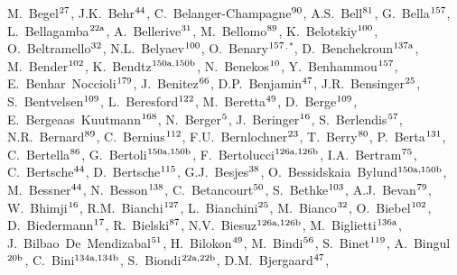 \begin{flushleft}
M.~Begel$^\textrm{\scriptsize 27}$,
J.K.~Behr$^\textrm{\scriptsize 44}$,
C.~Belanger-Champagne$^\textrm{\scriptsize 90}$,
A.S.~Bell$^\textrm{\scriptsize 81}$,
G.~Bella$^\textrm{\scriptsize 157}$,
L.~Bellagamba$^\textrm{\scriptsize 22a}$,
A.~Bellerive$^\textrm{\scriptsize 31}$,
M.~Bellomo$^\textrm{\scriptsize 89}$,
K.~Belotskiy$^\textrm{\scriptsize 100}$,
O.~Beltramello$^\textrm{\scriptsize 32}$,
N.L.~Belyaev$^\textrm{\scriptsize 100}$,
O.~Benary$^\textrm{\scriptsize 157}$$^{,*}$,
D.~Benchekroun$^\textrm{\scriptsize 137a}$,
M.~Bender$^\textrm{\scriptsize 102}$,
K.~Bendtz$^\textrm{\scriptsize 150a,150b}$,
N.~Benekos$^\textrm{\scriptsize 10}$,
Y.~Benhammou$^\textrm{\scriptsize 157}$,
E.~Benhar~Noccioli$^\textrm{\scriptsize 179}$,
J.~Benitez$^\textrm{\scriptsize 66}$,
D.P.~Benjamin$^\textrm{\scriptsize 47}$,
J.R.~Bensinger$^\textrm{\scriptsize 25}$,
S.~Bentvelsen$^\textrm{\scriptsize 109}$,
L.~Beresford$^\textrm{\scriptsize 122}$,
M.~Beretta$^\textrm{\scriptsize 49}$,
D.~Berge$^\textrm{\scriptsize 109}$,
E.~Bergeaas~Kuutmann$^\textrm{\scriptsize 168}$,
N.~Berger$^\textrm{\scriptsize 5}$,
J.~Beringer$^\textrm{\scriptsize 16}$,
S.~Berlendis$^\textrm{\scriptsize 57}$,
N.R.~Bernard$^\textrm{\scriptsize 89}$,
C.~Bernius$^\textrm{\scriptsize 112}$,
F.U.~Bernlochner$^\textrm{\scriptsize 23}$,
T.~Berry$^\textrm{\scriptsize 80}$,
P.~Berta$^\textrm{\scriptsize 131}$,
C.~Bertella$^\textrm{\scriptsize 86}$,
G.~Bertoli$^\textrm{\scriptsize 150a,150b}$,
F.~Bertolucci$^\textrm{\scriptsize 126a,126b}$,
I.A.~Bertram$^\textrm{\scriptsize 75}$,
C.~Bertsche$^\textrm{\scriptsize 44}$,
D.~Bertsche$^\textrm{\scriptsize 115}$,
G.J.~Besjes$^\textrm{\scriptsize 38}$,
O.~Bessidskaia~Bylund$^\textrm{\scriptsize 150a,150b}$,
M.~Bessner$^\textrm{\scriptsize 44}$,
N.~Besson$^\textrm{\scriptsize 138}$,
C.~Betancourt$^\textrm{\scriptsize 50}$,
S.~Bethke$^\textrm{\scriptsize 103}$,
A.J.~Bevan$^\textrm{\scriptsize 79}$,
W.~Bhimji$^\textrm{\scriptsize 16}$,
R.M.~Bianchi$^\textrm{\scriptsize 127}$,
L.~Bianchini$^\textrm{\scriptsize 25}$,
M.~Bianco$^\textrm{\scriptsize 32}$,
O.~Biebel$^\textrm{\scriptsize 102}$,
D.~Biedermann$^\textrm{\scriptsize 17}$,
R.~Bielski$^\textrm{\scriptsize 87}$,
N.V.~Biesuz$^\textrm{\scriptsize 126a,126b}$,
M.~Biglietti$^\textrm{\scriptsize 136a}$,
J.~Bilbao~De~Mendizabal$^\textrm{\scriptsize 51}$,
H.~Bilokon$^\textrm{\scriptsize 49}$,
M.~Bindi$^\textrm{\scriptsize 56}$,
S.~Binet$^\textrm{\scriptsize 119}$,
A.~Bingul$^\textrm{\scriptsize 20b}$,
C.~Bini$^\textrm{\scriptsize 134a,134b}$,
S.~Biondi$^\textrm{\scriptsize 22a,22b}$,
D.M.~Bjergaard$^\textrm{\scriptsize 47}$,
$$
\end{flushleft}
